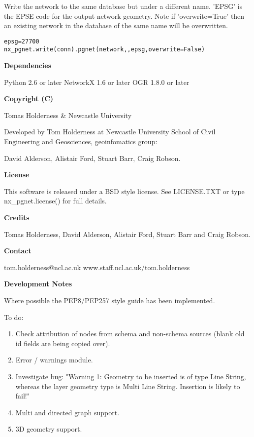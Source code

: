 Write the network to the same database but under a different name. 'EPSG' 
is the EPSE code for the output network geometry. Note if 'overwrite=True' 
then an existing network in the database of the same name will be 
overwritten.

\begin{alltt}
\pysrcprompt{{\textgreater}{\textgreater}{\textgreater} }epsg = 27700
\pysrcprompt{{\textgreater}{\textgreater}{\textgreater} }nx\_pgnet.write(conn).pgnet(network, , epsg, overwrite=False)\end{alltt}
\textbf{Dependencies}

Python 2.6 or later NetworkX 1.6 or later OGR 1.8.0 or later

\textbf{Copyright (C)}

Tomas Holderness \& Newcastle University

Developed by Tom Holderness at Newcastle University School of Civil 
Engineering and Geosciences, geoinfomatics group:

David Alderson, Alistair Ford, Stuart Barr, Craig Robson.

\textbf{License}

This software is released under a BSD style license. See LICENSE.TXT or 
type nx\_pgnet.license() for full details.

\textbf{Credits}

Tomas Holderness, David Alderson, Alistair Ford, Stuart Barr and Craig 
Robson.

\textbf{Contact}

tom.holderness@ncl.ac.uk www.staff.ncl.ac.uk/tom.holderness

\textbf{Development Notes}

Where possible the PEP8/PEP257 style guide has been implemented.

To do:

\begin{enumerate}

\setlength{\parskip}{0.5ex}
  \item Check attribution of nodes from schema and non-schema sources (blank 
    old id fields are being copied over).

  \item Error  / warnings module.

  \item Investigate bug: "Warning 1: Geometry to be inserted is of type Line 
    String, whereas the layer geometry type is Multi Line String. Insertion
    is likely to fail!"

  \item Multi and directed graph support.

  \item 3D geometry support.

\end{enumerate}

